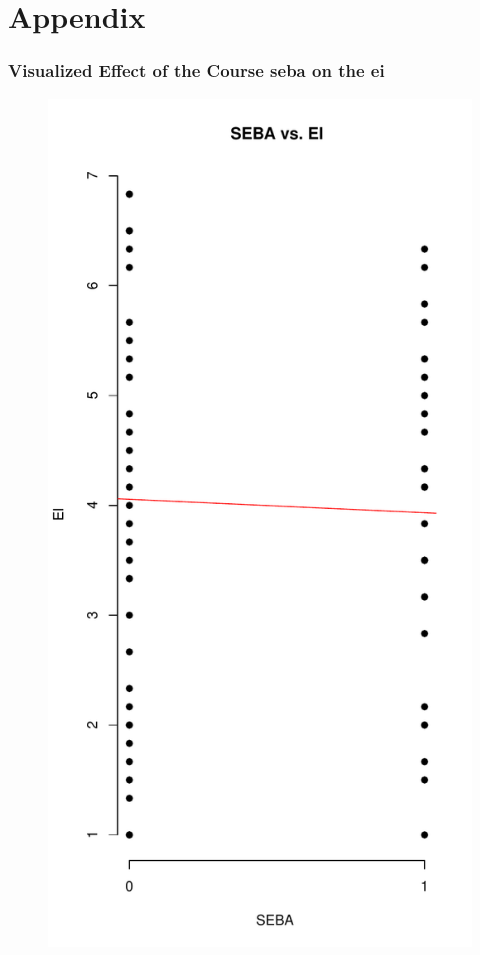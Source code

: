 \part*{Appendix}
\renewcommand{\thesection}{\arabic{section}}
\renewcommand{\theequation}{\arabic{equation}}

\section{Visualized Effect of the Course \acl{seba} on the \acl{ei}}
\label{app:graphs}


\begin{figure}[H]
\centering
\begin{minipage}{.5\textwidth}
  \centering
  \includegraphics[width=.5\linewidth]{images/SEBAvsEI.pdf}
  \label{fig:test1}
\end{minipage}%
\begin{minipage}{.5\textwidth}
  \centering

\end{minipage}
\end{figure}
